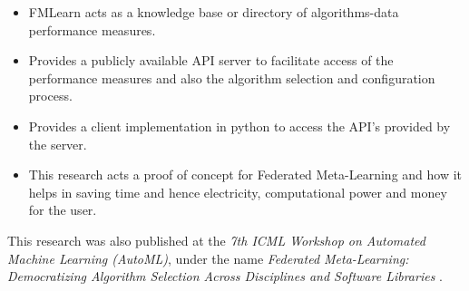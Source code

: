 \begin{itemize}
    \item FMLearn acts as a knowledge base or directory of algorithms-data performance measures.
    \item Provides a publicly available API server to facilitate access of the performance measures and also the algorithm selection and configuration process.
    \item Provides a client implementation in python to access the API's provided by the server.
    \item This research acts a proof of concept for Federated Meta-Learning and how it helps in saving time and hence electricity, computational power and money for the user.
\end{itemize}

This research was also published at the \textit{7th ICML Workshop on Automated Machine Learning (AutoML)}, under the name \textit{Federated Meta-Learning: Democratizing Algorithm Selection Across Disciplines and Software Libraries} \citep{arambakam_beel_2020}.
